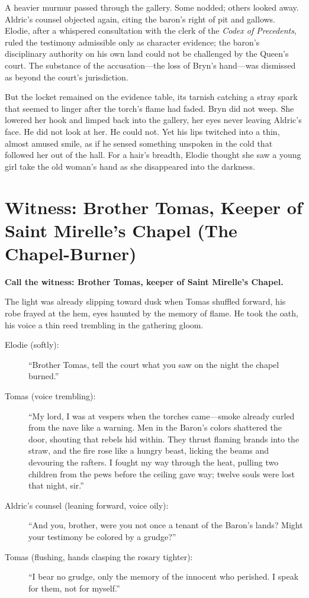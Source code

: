 \documentclass[11pt,twoside]{book}
\begin{document}
A heavier murmur passed through the gallery. Some nodded; others looked away. Aldric's counsel objected again, citing the baron's right of pit and gallows. Elodie, after a whispered consultation with the clerk of the \textit{Codex of Precedents}, ruled the testimony admissible only as character evidence; the baron's disciplinary authority on his own land could not be challenged by the Queen's court. The substance of the accusation---the loss of Bryn's hand---was dismissed as beyond the court's jurisdiction.

But the locket remained on the evidence table, its tarnish catching a stray spark that seemed to linger after the torch's flame had faded. Bryn did not weep. She lowered her hook and limped back into the gallery, her eyes never leaving Aldric's face. He did not look at her. He could not. Yet his lips twitched into a thin, almost amused smile, as if he sensed something unspoken in the cold that followed her out of the hall. For a hair's breadth, Elodie thought she saw a young girl take the old woman's hand as she disappeared into the darkness.
\newpage

\section*{Witness: Brother Tomas, Keeper of Saint Mirelle's Chapel (The Chapel-Burner)}

\textbf{Call the witness: Brother Tomas, keeper of Saint Mirelle's Chapel.}

The light was already slipping toward dusk when Tomas shuffled forward, his robe frayed at the hem, eyes haunted by the memory of flame. He took the oath, his voice a thin reed trembling in the gathering gloom.

\begin{description}
\item[Elodie (softly):] ``Brother Tomas, tell the court what you saw on the night the chapel burned.''
\item[Tomas (voice trembling):] ``My lord, I was at vespers when the torches came---smoke already curled from the nave like a warning. Men in the Baron's colors shattered the door, shouting that rebels hid within. They thrust flaming brands into the straw, and the fire rose like a hungry beast, licking the beams and devouring the rafters. I fought my way through the heat, pulling two children from the pews before the ceiling gave way; twelve souls were lost that night, sir.''
\item[Aldric's counsel (leaning forward, voice oily):] ``And you, brother, were you not once a tenant of the Baron's lands? Might your testimony be colored by a grudge?''
\item[Tomas (flushing, hands clasping the rosary tighter):] ``I bear no grudge, only the memory of the innocent who perished. I speak for them, not for myself.''
\end{description}
\end{document}
